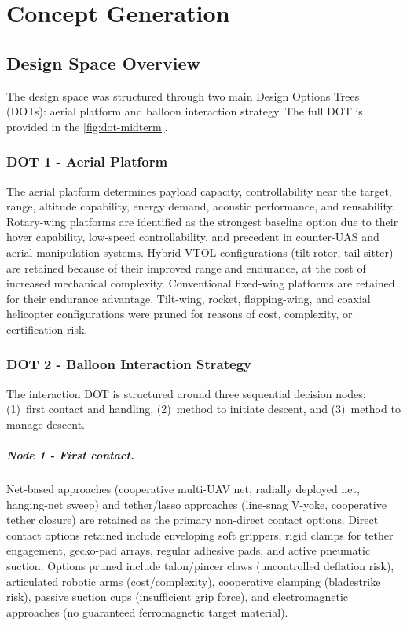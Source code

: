 \chapter{Concept Generation}


\section{Design Space Overview}

The design space was structured through two main Design Options
Trees (DOTs): aerial platform and balloon
interaction strategy. The full DOT is provided in the \autoref{fig:dot-midterm}.

\subsection*{DOT 1 - Aerial Platform}
The aerial platform determines payload capacity,
controllability near the target, range, altitude capability,
energy demand, acoustic performance, and reusability.
Rotary-wing platforms are identified as the strongest
baseline option due to their hover capability, low-speed
controllability, and precedent in counter-UAS and aerial
manipulation systems. Hybrid VTOL configurations
(tilt-rotor, tail-sitter) are retained because of their
improved range and endurance, at the cost of increased
mechanical complexity. Conventional fixed-wing
platforms are retained for their endurance advantage.
Tilt-wing, rocket, flapping-wing, and coaxial helicopter
configurations were pruned for reasons of cost, complexity,
or certification risk.

\subsection*{DOT 2 - Balloon Interaction Strategy}
The interaction DOT is structured around three sequential
decision nodes: (1)~first contact and handling,
(2)~method to initiate descent, and (3)~method to manage
descent.
\vspace{-15pt}

\paragraph{Node 1 - First contact.}
Net-based approaches (cooperative multi-UAV net, radially
deployed net, hanging-net sweep) and tether/lasso approaches
(line-snag V-yoke, cooperative tether closure) are retained
as the primary non-direct contact options. Direct contact
options retained include enveloping soft grippers, rigid
clamps for tether engagement, gecko-pad arrays, regular
adhesive pads, and active pneumatic suction. Options pruned
include talon/pincer claws (uncontrolled deflation risk),
articulated robotic arms (cost/complexity), cooperative
clamping (bladestrike risk), passive suction cups (insufficient grip force), and electromagnetic approaches (no guaranteed ferromagnetic target material).
\vspace{-15pt}
